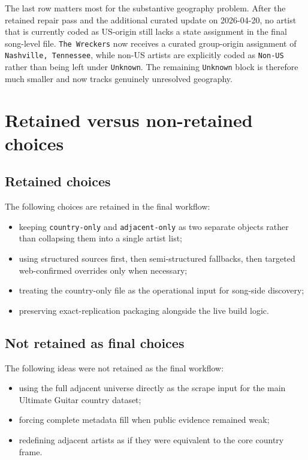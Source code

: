 \documentclass[11pt]{article}
\begin{document}
The last row matters most for the substantive geography problem. After the
retained repair pass and the additional curated update on 2026-04-20, no
artist that is currently coded as US-origin still lacks a state assignment in
the final song-level file. \texttt{The Wreckers} now receives a curated
group-origin assignment of \texttt{Nashville, Tennessee}, while non-US artists
are explicitly coded as \texttt{Non-US} rather than being left under
\texttt{Unknown}. The remaining \texttt{Unknown} block is therefore much
smaller and now tracks genuinely unresolved geography.

\section{Retained versus non-retained choices}
\subsection{Retained choices}
The following choices are retained in the final workflow:
\begin{itemize}[leftmargin=2em]
\item keeping \texttt{country-only} and \texttt{adjacent-only} as two separate
objects rather than collapsing them into a single artist list;
\item using structured sources first, then semi-structured fallbacks, then
targeted web-confirmed overrides only when necessary;
\item treating the country-only file as the operational input for song-side
discovery;
\item preserving exact-replication packaging alongside the live build logic.
\end{itemize}

\subsection{Not retained as final choices}
The following ideas were not retained as the final workflow:
\begin{itemize}[leftmargin=2em]
\item using the full adjacent universe directly as the scrape input for the
main Ultimate Guitar country dataset;
\item forcing complete metadata fill when public evidence remained weak;
\item redefining adjacent artists as if they were equivalent to the core
country frame.
\end{itemize}
\end{document}
